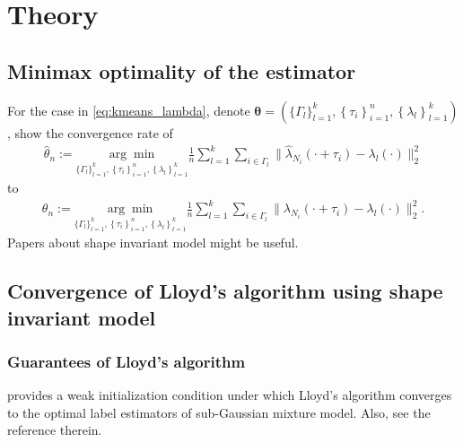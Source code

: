 

\section{Theory}




	\subsection{Minimax optimality of the estimator}
		For the case in \eqref{eq:kmeans_lambda}, denote $\mathbf{\theta}=\left( \{\Gamma_l\}_{l=1}^k, \left\{ \tau_i \right\}_{i=1}^n, \left\{ \lambda_l \right\}_{l=1}^k \right)$, show the convergence rate of
			\begin{align*}
			\hat\theta_n := 
			\underset{\{\Gamma_l\}_{l=1}^k, \left\{ \tau_i \right\}_{i=1}^n, \left\{ \lambda_l \right\}_{l=1}^k}{\arg\min}
			\frac{1}{n} \sum_{l=1}^k \sum_{i\in\Gamma_l} \|\hat\lambda_{N_i}(\cdot+\tau_i)- \lambda_l(\cdot)\|_2^2 
			\end{align*}
		to 
			\begin{align*}
				\theta_n := 
				\underset{\{\Gamma_l\}_{l=1}^k, \left\{ \tau_i \right\}_{i=1}^n, \left\{ \lambda_l \right\}_{l=1}^k}{\arg\min}
				\frac{1}{n} \sum_{l=1}^k \sum_{i\in\Gamma_l} \|\lambda_{N_i}(\cdot+\tau_i)- \lambda_l(\cdot)\|_2^2.
			\end{align*}
		Papers about shape invariant model might be useful. 
		
		
		
		
		
		




	\subsection{Convergence of Lloyd's algorithm using shape invariant model}
		\subsubsection*{Guarantees of Lloyd's algorithm}
			\citet{Lu} provides a weak initialization condition under which Lloyd's algorithm converges to the optimal label estimators of sub-Gaussian mixture model.
			Also, see the reference therein.

